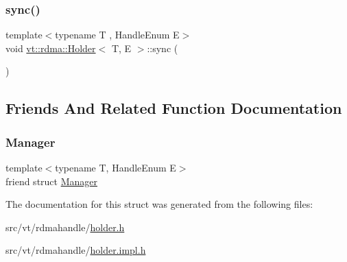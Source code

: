 \subsubsection{\texorpdfstring{sync()}{sync()}}
{\footnotesize\ttfamily template$<$typename T , Handle\+Enum E$>$ \\
void \hyperlink{structvt_1_1rdma_1_1_holder}{vt\+::rdma\+::\+Holder}$<$ T, E $>$\+::sync (\begin{DoxyParamCaption}{ }\end{DoxyParamCaption})}



\subsection{Friends And Related Function Documentation}
\mbox{\label{structvt_1_1rdma_1_1_holder_a1fd6b9bc3f72bb2b64e602de3982929d}} 
\subsubsection{\texorpdfstring{Manager}{Manager}}
{\footnotesize\ttfamily template$<$typename T, Handle\+Enum E$>$ \\
friend struct \hyperlink{structvt_1_1rdma_1_1_manager}{Manager}\hspace{0.3cm}{\ttfamily [friend]}}



The documentation for this struct was generated from the following files\+:\begin{DoxyCompactItemize}
\item 
src/vt/rdmahandle/\hyperlink{rdmahandle_2holder_8h}{holder.\+h}\item 
src/vt/rdmahandle/\hyperlink{rdmahandle_2holder_8impl_8h}{holder.\+impl.\+h}\end{DoxyCompactItemize}
